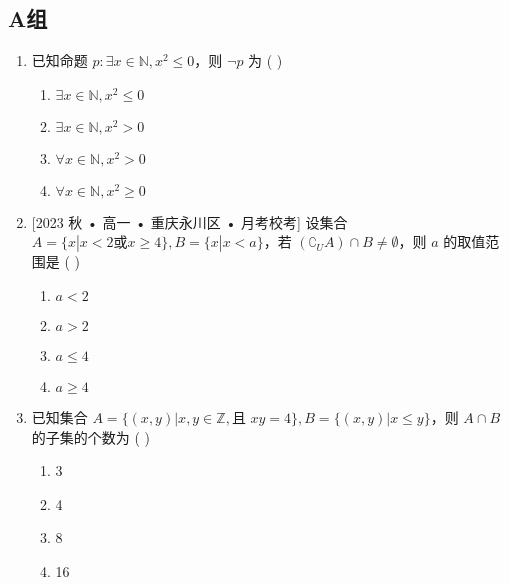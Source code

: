 \documentclass[12pt,a4paper]{ctexbook}
\theoremstyle{definition}
\theoremstyle{remark}
\begin{document}
	\subsection*{A组}
	\begin{enumerate}
		\item 已知命题 $p: \exists x \in \mathbb{N}, x^2 \le 0$，则 $\neg p$ 为 ( \hspace{2cm} )
		\begin{enumerate}
			\item $\exists x \in \mathbb{N}, x^2 \le 0$
			\item $\exists x \in \mathbb{N}, x^2 > 0$
			\item $\forall x \in \mathbb{N}, x^2 > 0$
			\item $\forall x \in \mathbb{N}, x^2 \ge 0$
		\end{enumerate}
		
		\item {[2023 秋 • 高一 • 重庆永川区 • 月考校考]} 设集合 $A=\{x|x<2 \text{或} x \ge 4\}, B=\{x|x<a\}$，若 $(∁_U A) \cap B \neq \emptyset$，则 $a$ 的取值范围是 ( \hspace{2cm} )
		\begin{enumerate}
			\item $a < 2$
			\item $a > 2$
			\item $a \le 4$
			\item $a \ge 4$
		\end{enumerate}
		
		\item 已知集合 $A=\{(x,y) | x,y \in \mathbb{Z}, \text{且 } xy=4\}, B=\{(x,y) | x \le y\}$，则 $A \cap B$ 的子集的个数为 ( \hspace{2cm} )
		\begin{enumerate}
			\item 3
			\item 4
			\item 8
			\item 16
		\end{enumerate}
	\end{enumerate}
	
\end{document}
